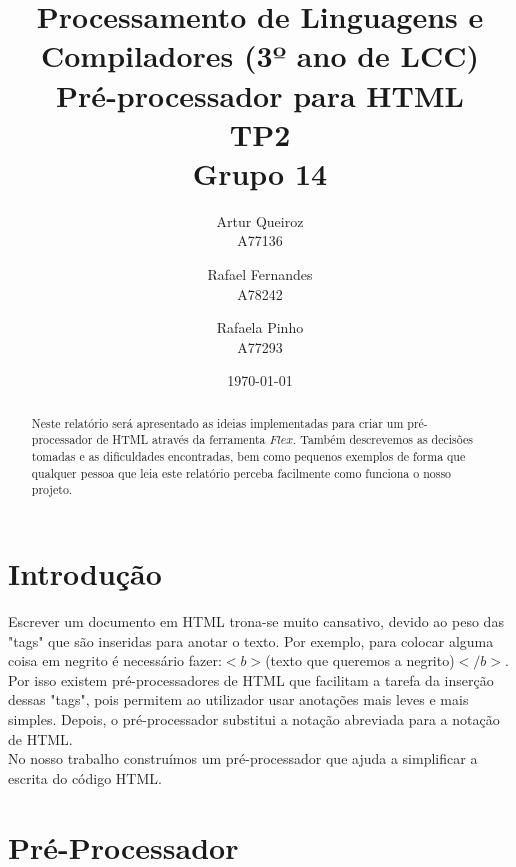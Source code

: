 \documentclass{report}
\title{Processamento de Linguagens e Compiladores (3º ano de LCC)\\ \textbf{Pré-processador para HTML}\\ TP2\\ Grupo 14}
\author{Artur Queiroz\\ A77136 \and  Rafael Fernandes\\ A78242 \and Rafaela Pinho\\ A77293 }
\date{\today}
\begin{document}
\maketitle

\begin{abstract}
Neste relatório será apresentado as ideias implementadas para criar um pré-processador de HTML através da ferramenta $Flex$. 
Também descrevemos as decisões tomadas e as dificuldades encontradas, bem como pequenos exemplos de forma que qualquer pessoa que leia este relatório perceba facilmente como funciona o nosso projeto.
\end{abstract}

\tableofcontents

\chapter{Introdução} \label{intro}
Escrever um documento em HTML trona-se muito cansativo, devido ao peso das "tags" que são inseridas para anotar o texto. Por exemplo, para colocar alguma coisa em negrito é necessário fazer:$ <b>$(texto que queremos a negrito)$</b>$. \\ 
Por isso existem pré-processadores de HTML que facilitam a tarefa da inserção dessas "tags", pois permitem ao utilizador usar anotações mais leves e mais simples. Depois, o pré-processador substitui a notação abreviada para a notação de HTML.\\ 
No nosso trabalho construímos um pré-processador que ajuda a simplificar a escrita do código HTML. 


\chapter{Pré-Processador} \label{fi}
\end{document}
